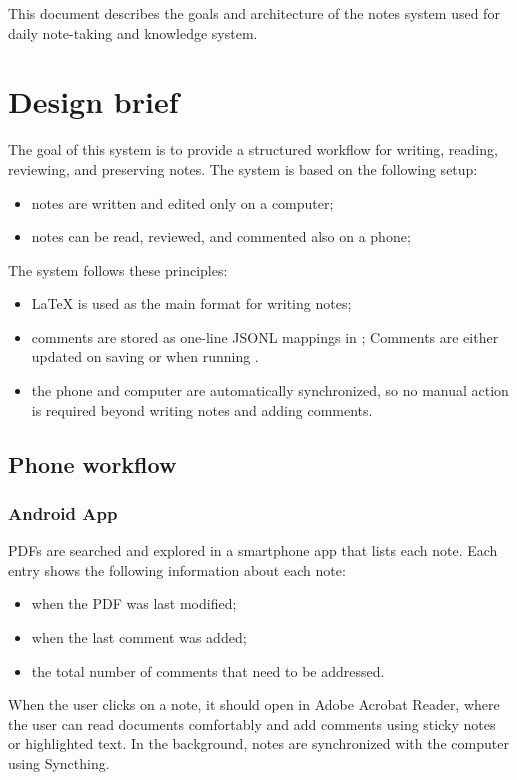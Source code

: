 
This document describes the goals and architecture of the notes system used for daily note-taking and knowledge system.

\section*{Design brief}
The goal of this system is to provide a structured workflow for writing, reading, reviewing, and preserving notes.
The system is based on the following setup:
\begin{itemize}
  \item notes are written and edited only on a computer;
  \item notes can be read, reviewed, and commented also on a phone;
\end{itemize}
The system follows these principles:
\begin{itemize}
\item LaTeX is used as the main format for writing notes;
\item comments are stored as one-line JSONL mappings in ;
Comments are either updated on saving  or when running .
\item the phone and computer are automatically synchronized, so no manual action is required beyond writing notes and adding comments.
\end{itemize}

\subsection*{Phone workflow}
\subsubsection*{Android App}
PDFs are searched and explored in a smartphone app that lists each note.
Each entry shows the following information about each note:
\begin{itemize}
  \item when the PDF was last modified;
  \item when the last comment was added;
  \item the total number of comments that need to be addressed.
\end{itemize}
When the user clicks on a note, it should open in Adobe Acrobat Reader, where the user can read documents comfortably and add comments using sticky notes or highlighted text.
In the background, notes are synchronized with the computer using Syncthing.

